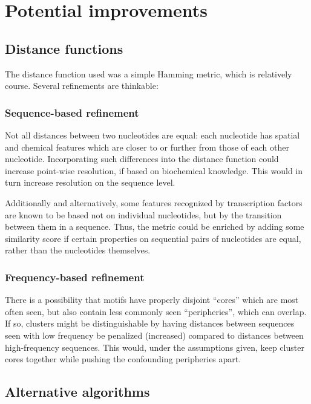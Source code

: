 \documentclass[fleqn]{book}
\begin{document}
\section{Potential improvements}\label{potential-improvements}

\subsection{Distance functions}\label{distance-functions}

The distance function used was a simple Hamming metric, which is
relatively course. Several refinements are thinkable:

\subsubsection{Sequence-based
refinement}\label{sequence-based-refinement}

Not all distances between two nucleotides are equal: each nucleotide has
spatial and chemical features which are closer to or further from those
of each other nucleotide. Incorporating such differences into the
distance function could increase point-wise resolution, if based on
biochemical knowledge. This would in turn increase resolution on the
sequence level.

Additionally and alternatively, some features recognized by
transcription factors are known to be based not on individual
nucleotides, but by the transition between them in a sequence. Thus, the
metric could be enriched by adding some similarity score if certain
properties on sequential pairs of nucleotides are equal, rather than the
nucleotides themselves.

\subsubsection{Frequency-based
refinement}\label{frequency-based-refinement}

There is a possibility that motifs have properly disjoint ``cores''
which are most often seen, but also contain less commonly seen
``peripheries'', which can overlap. If so, clusters might be
distinguishable by having distances between sequences seen with low
frequency be penalized (increased) compared to distances between
high-frequency sequences. This would, under the assumptions given, keep
cluster cores together while pushing the confounding peripheries apart.

\subsection{Alternative algorithms}\label{alternative-algorithms}
\end{document}
